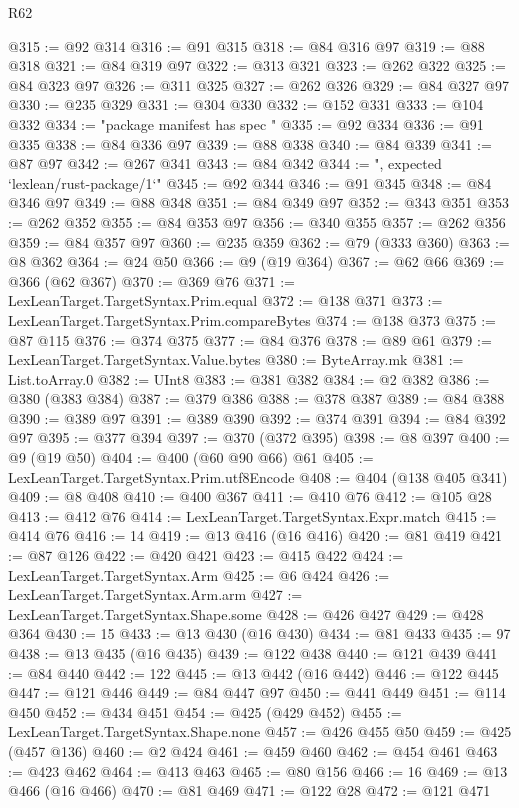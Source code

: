 \begin{lexlean}{R62}
\begin{coremodule}
@315 := @92 @314
@316 := @91 @315
@318 := @84 @316 @97
@319 := @88 @318
@321 := @84 @319 @97
@322 := @313 @321
@323 := @262 @322
@325 := @84 @323 @97
@326 := @311 @325
@327 := @262 @326
@329 := @84 @327 @97
@330 := @235 @329
@331 := @304 @330
@332 := @152 @331
@333 := @104 @332
@334 := "package manifest has spec "
@335 := @92 @334
@336 := @91 @335
@338 := @84 @336 @97
@339 := @88 @338
@340 := @84 @339
@341 := @87 @97
@342 := @267 @341
@343 := @84 @342
@344 := ", expected `lexlean/rust-package/1`"
@345 := @92 @344
@346 := @91 @345
@348 := @84 @346 @97
@349 := @88 @348
@351 := @84 @349 @97
@352 := @343 @351
@353 := @262 @352
@355 := @84 @353 @97
@356 := @340 @355
@357 := @262 @356
@359 := @84 @357 @97
@360 := @235 @359
@362 := @79 (@333 @360)
@363 := @8 @362
@364 := @24 @50
@366 := @9 (@19 @364)
@367 := @62 @66
@369 := @366 (@62 @367)
@370 := @369 @76
@371 := LexLeanTarget.TargetSyntax.Prim.equal
@372 := @138 @371
@373 := LexLeanTarget.TargetSyntax.Prim.compareBytes
@374 := @138 @373
@375 := @87 @115
@376 := @374 @375
@377 := @84 @376
@378 := @89 @61
@379 := LexLeanTarget.TargetSyntax.Value.bytes
@380 := ByteArray.mk
@381 := List.toArray.{0}
@382 := UInt8
@383 := @381 @382
@384 := @2 @382
@386 := @380 (@383 @384)
@387 := @379 @386
@388 := @378 @387
@389 := @84 @388
@390 := @389 @97
@391 := @389 @390
@392 := @374 @391
@394 := @84 @392 @97
@395 := @377 @394
@397 := @370 (@372 @395)
@398 := @8 @397
@400 := @9 (@19 @50)
@404 := @400 (@60 @90 @66) @61
@405 := LexLeanTarget.TargetSyntax.Prim.utf8Encode
@408 := @404 (@138 @405 @341)
@409 := @8 @408
@410 := @400 @367
@411 := @410 @76
@412 := @105 @28
@413 := @412 @76
@414 := LexLeanTarget.TargetSyntax.Expr.match
@415 := @414 @76
@416 := 14
@419 := @13 @416 (@16 @416)
@420 := @81 @419
@421 := @87 @126
@422 := @420 @421
@423 := @415 @422
@424 := LexLeanTarget.TargetSyntax.Arm
@425 := @6 @424
@426 := LexLeanTarget.TargetSyntax.Arm.arm
@427 := LexLeanTarget.TargetSyntax.Shape.some
@428 := @426 @427
@429 := @428 @364
@430 := 15
@433 := @13 @430 (@16 @430)
@434 := @81 @433
@435 := 97
@438 := @13 @435 (@16 @435)
@439 := @122 @438
@440 := @121 @439
@441 := @84 @440
@442 := 122
@445 := @13 @442 (@16 @442)
@446 := @122 @445
@447 := @121 @446
@449 := @84 @447 @97
@450 := @441 @449
@451 := @114 @450
@452 := @434 @451
@454 := @425 (@429 @452)
@455 := LexLeanTarget.TargetSyntax.Shape.none
@457 := @426 @455 @50
@459 := @425 (@457 @136)
@460 := @2 @424
@461 := @459 @460
@462 := @454 @461
@463 := @423 @462
@464 := @413 @463
@465 := @80 @156
@466 := 16
@469 := @13 @466 (@16 @466)
@470 := @81 @469
@471 := @122 @28
@472 := @121 @471

\end{coremodule}
\end{lexlean}
